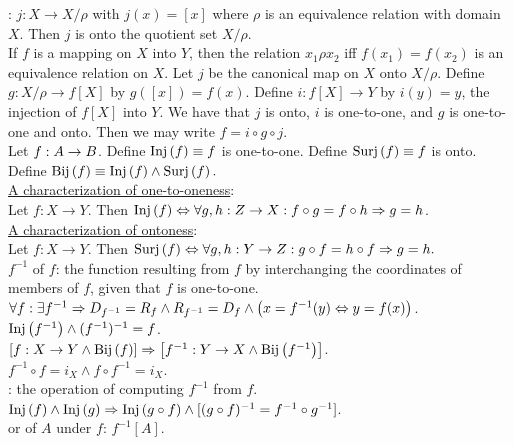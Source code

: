 \documentclass[12pt]{book}
\begin{document}
: $j:X\rightarrow X/\rho$ with $j(x)=[x]$ where $\rho$ is an equivalence relation with domain $X$. Then $j$ is onto the quotient set $X/\rho$.\\

If $f$ is a mapping on $X$ into $Y$, then the relation $x_1\rho x_2$ iff $f(x_1) = f(x_2)$ is an equivalence relation on $X$. Let $j$ be the canonical map on $X$ onto $X/\rho$. Define $g:X/\rho\rightarrow f[X]$ by $g([x]) = f(x)$. Define $i:f[X]\rightarrow Y$ by $i(y) = y$, the injection of $f[X]$ into $Y$. We have that $j$ is onto, $i$ is one-to-one, and $g$ is one-to-one and onto. Then we may write $f = i \circ g \circ j$.\\

Let $f:A\rightarrow B$. Define $\text{Inj}\left(f\right)\equiv f$ is one-to-one. Define $\text{Surj}\left(f\right)\equiv f$ is onto. Define $\text{Bij}\left(f\right)\equiv \text{Inj}\left(f\right) \land \text{Surj}\left(f\right).$\\ 

\underline{A characterization of one-to-oneness}:\\
Let $f:X\rightarrow Y$. Then $\text{Inj}\left(f\right) \Leftrightarrow \forall g,h:Z\rightarrow X: f\circ g = f\circ h \Rightarrow g=h$.\\

\underline{A characterization of ontoness}:\\
Let $f:X\rightarrow Y$. Then $\text{Surj}\left(f\right) \Leftrightarrow \forall g,h:Y\rightarrow Z: g\circ f = h \circ f \Rightarrow g=h.$\\

 $f^{-1}$ of $f$: the function resulting from $f$ by interchanging the coordinates of members of $f$, given that $f$ is one-to-one.\\
$\forall f:\exists f^{-1} \Rightarrow D_{f^{-1}}=R_f \land R_{f^{-1}}=D_f \land \left(x=f^{-1}(y) \Leftrightarrow y=f(x)\right)$.\\ 
$\text{Inj}\left(f^{-1}\right) \land (f^{-1})^{-1} = f$.\\
$\left[f:X\rightarrow Y \land \text{Bij}\left(f\right)\right]\Rightarrow \left[f^{-1}:Y\rightarrow X \land \text{Bij}\left(f^{-1}\right)\right]$.\\
$f^{-1}\circ f = i_X \land f\circ f^{-1} = i_X$.\\

: the operation of computing $f^{-1}$ from $f$.\\

$\text{Inj}\left(f\right)\land\text{Inj}\left(g\right) \Rightarrow \text{Inj}\left(g\circ f\right) \land [(g\circ f)^{-1} = f^{-1} \circ g^{-1}]$.\\

 or  of $A$ under $f$: $f^{-1}[A]$.
\end{document}
